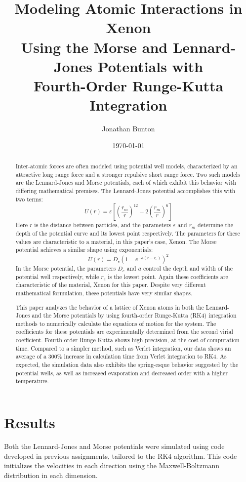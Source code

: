 \documentclass[12pt]{article}
\author{Jonathan Bunton}
\title{Modeling Atomic Interactions in Xenon \\ Using the Morse and Lennard-Jones Potentials with \\
Fourth-Order Runge-Kutta Integration}
\date{\today}
\begin{document}
\maketitle
\onehalfspacing
\begin{abstract}
Inter-atomic forces are often modeled using potential well models, characterized by an attractive long range force and a stronger repulsive short range force.   Two such models are the Lennard-Jones and Morse potentials, each of which exhibit this behavior with differing mathematical premises.  The Lennard-Jones potential accomplishes this with two terms:
\begin{equation*}
U(r) = \varepsilon\left[ \left( \frac{r_m}{r} \right)^{12}-2\left(\frac{r_m}{r}\right)^6\right]
\end{equation*}
Here $r$ is the distance between particles, and the parameters $\varepsilon$ and $r_m$ determine the depth of the potential curve and its lowest point respectively. \cite{ljpotential} The parameters for these values are characteristic to a material, in this paper's case, Xenon.  The Morse potential achieves a similar shape using exponentials:
\begin{equation*}
U(r) = D_e \left(1-e^{-a(r-r_e)}\right)^2
\end{equation*}
In the Morse potential, the parameters $D_e$ and $a$ control the depth and width of the potential well respectively, while $r_e$ is the lowest point. \cite{mpotential}  Again these coefficients are characteristic of the material, Xenon for this paper.   Despite very different mathematical formulation, these potentials have very similar shapes.

This paper analyzes the behavior of a lattice of Xenon atoms in both the Lennard-Jones and the Morse potentials by using fourth-order Runge-Kutta (RK4) integration methods to numerically calculate the equations of motion for the system. \cite{rk4} The coefficients for these potentials are experimentally determined from the second virial coefficient. \cite{mconstants, ljconstants}  Fourth-order Runge-Kutta shows high precision, at the cost of computation time.  Compared to a simpler method, such as Verlet integration, our data shows an average of a 300\% increase in calculation time from Verlet integration to RK4. 
As expected, the simulation data also exhibits the spring-esque behavior suggested by the potential wells, as well as increased evaporation and decreased order with a higher temperature.
\end{abstract}
\section*{Results}
Both the Lennard-Jones and Morse potentials were simulated using code developed in previous assignments, tailored to the RK4 algorithm.  This code initializes the velocities in each direction using the Maxwell-Boltzmann distribution in each dimension.  
\end{document}
